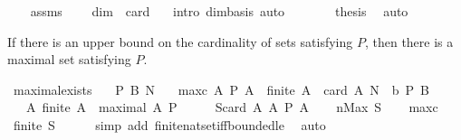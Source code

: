 \begin{isabellebody}
\ \ \isamarkupfalse%
\ assms\ {}\ \isamarkupfalse%
\ {}{\isacharcolon}\ {\isachardoublequoteopen}dim\ {\isacharequal}\ card\ {\isasymbeta}{\isachardoublequoteclose}\ \isamarkupfalse%
\ {\isacharparenleft}intro\ dim{\isacharunderscore}basis{\isacharcomma}\ auto{\isacharparenright}\isanewline
\ \ \isamarkupfalse%
\ {}\ {}\ \isamarkupfalse%
\ {\isacharquery}thesis\ \isamarkupfalse%
\ auto\isanewline
{}\isamarkupfalse%
%
\endisatagproof
{\isafoldproof}%
%
\isadelimproof
%
\endisadelimproof
%
\begin{isamarkuptext}%
If there is an upper bound on the cardinality of sets satisfying $P$, then there is a maximal
set satisfying $P$.%
\end{isamarkuptext}%
\isamarkuptrue%
\isamarkupfalse%
\ maximal{\isacharunderscore}exists{\isacharcolon}\isanewline
\ \ \ P\ B\ N\isanewline
\ \ \ maxc{\isacharcolon}\ {\isachardoublequoteopen}{\isasymAnd}A{\isachardot}\ P\ A\ {\isasymLongrightarrow}\ finite\ A\ {\isasymand}\ {\isacharparenleft}card\ A\ {\isasymle}N{\isacharparenright}{\isachardoublequoteclose}\ \ b{\isacharcolon}\ {\isachardoublequoteopen}P\ B{\isachardoublequoteclose}\isanewline
\ \ \ {\isachardoublequoteopen}{\isasymexists}A{\isachardot}\ finite\ A\ {\isasymand}\ maximal\ A\ P{\isachardoublequoteclose}\isanewline
%
\isadelimproof
%
\endisadelimproof
%
\isatagproof
{}\isamarkupfalse%
\ {\isacharminus}\isanewline
\isanewline
\ \ \isamarkupfalse%
\ {\isacharquery}S{\isacharequal}{\isachardoublequoteopen}{\isacharbraceleft}card\ A{\isacharbar}\ A{\isachardot}\ P\ A{\isacharbraceright}{\isachardoublequoteclose}\isanewline
\ \ \isamarkupfalse%
\ {\isacharquery}n{\isacharequal}{\isachardoublequoteopen}Max\ {\isacharquery}S{\isachardoublequoteclose}\isanewline
\ \ \isamarkupfalse%
\ maxc\ \isamarkupfalse%
\ {}{\isacharcolon}{\isachardoublequoteopen}finite\ {\isacharquery}S{\isachardoublequoteclose}\isanewline
\ \ \ \ \isamarkupfalse%
\ {\isacharparenleft}simp\ add{\isacharcolon}\ finite{\isacharunderscore}nat{\isacharunderscore}set{\isacharunderscore}iff{\isacharunderscore}bounded{\isacharunderscore}le{\isacharparenright}\ \isamarkupfalse%
\ auto\isanewline
\ \ \isamarkupfalse%
\ {}\ \isamarkupfalse%

\end{isabellebody}
